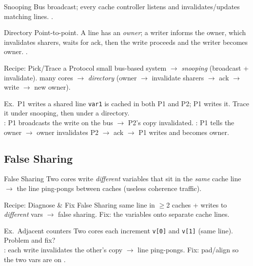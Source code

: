 \begin{definition}{Snooping}
    Bus broadcast; every cache controller listens and invalidates/updates matching lines. .
\end{definition}

\begin{definition}{Directory}
    Point-to-point. A line has an \emph{owner}; a writer informs the owner, which invalidates sharers, waits for ack, then the write proceeds and the writer becomes owner. .
\end{definition}

\multend

\begin{KR}{Recipe: Pick/Trace a Protocol}
    small bus-based system $\to$ \emph{snooping} (broadcast + invalidate). many cores $\to$ \emph{directory} (owner $\to$ invalidate sharers $\to$ ack $\to$ write $\to$ new owner).
\end{KR}

\begin{example2}{Ex.\ P1 writes a shared line}
    \texttt{var1} is cached in both P1 and P2; P1 writes it. Trace it under snooping, then under a directory.
     \\ 
    : P1 broadcasts the write on the bus $\to$ P2's copy invalidated. : P1 tells the owner $\to$ owner invalidates P2 $\to$ ack $\to$ P1 writes and becomes owner.
\end{example2}

\subsection{False Sharing}

\begin{definition}{False Sharing}
    Two cores write \emph{different} variables that sit in the \emph{same} cache line $\to$ the line ping-pongs between caches (useless coherence traffic).
\end{definition}

\begin{KR}{Recipe: Diagnose \& Fix False Sharing}
    same line in $\geq$2 caches + writes to \emph{different} vars $\to$ false sharing. Fix:  the variables onto separate cache lines.
\end{KR}

\begin{example2}{Ex.\ Adjacent counters}
    Two cores each increment \texttt{v[0]} and \texttt{v[1]} (same line). Problem and fix?
     \\ 
    : each write invalidates the other's copy $\to$ line ping-pongs. Fix: pad/align so the two vars are on .
\end{example2}


